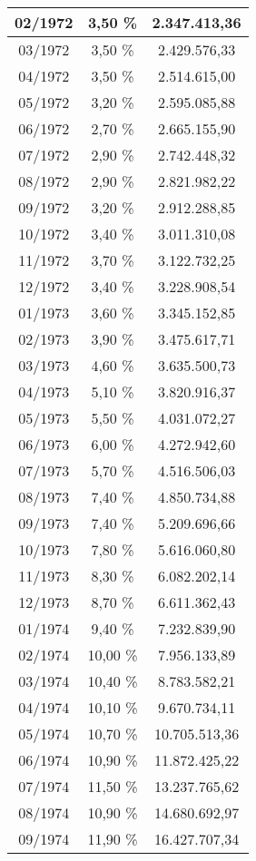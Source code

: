 \begin{center}
\begin{longtable}{|c|c|c|}
02/1972 & 3,50 \% & 2.347.413,36 \\ \hline
03/1972 & 3,50 \% & 2.429.576,33 \\ \hline
04/1972 & 3,50 \% & 2.514.615,00 \\ \hline
05/1972 & 3,20 \% & 2.595.085,88 \\ \hline
06/1972 & 2,70 \% & 2.665.155,90 \\ \hline
07/1972 & 2,90 \% & 2.742.448,32 \\ \hline
08/1972 & 2,90 \% & 2.821.982,22 \\ \hline
09/1972 & 3,20 \% & 2.912.288,85 \\ \hline
10/1972 & 3,40 \% & 3.011.310,08 \\ \hline
11/1972 & 3,70 \% & 3.122.732,25 \\ \hline
12/1972 & 3,40 \% & 3.228.908,54 \\ \hline
01/1973 & 3,60 \% & 3.345.152,85 \\ \hline
02/1973 & 3,90 \% & 3.475.617,71 \\ \hline
03/1973 & 4,60 \% & 3.635.500,73 \\ \hline
04/1973 & 5,10 \% & 3.820.916,37 \\ \hline
05/1973 & 5,50 \% & 4.031.072,27 \\ \hline
06/1973 & 6,00 \% & 4.272.942,60 \\ \hline
07/1973 & 5,70 \% & 4.516.506,03 \\ \hline
08/1973 & 7,40 \% & 4.850.734,88 \\ \hline
09/1973 & 7,40 \% & 5.209.696,66 \\ \hline
10/1973 & 7,80 \% & 5.616.060,80 \\ \hline
11/1973 & 8,30 \% & 6.082.202,14 \\ \hline
12/1973 & 8,70 \% & 6.611.362,43 \\ \hline
01/1974 & 9,40 \% & 7.232.839,90 \\ \hline
02/1974 & 10,00 \% & 7.956.133,89 \\ \hline
03/1974 & 10,40 \% & 8.783.582,21 \\ \hline
04/1974 & 10,10 \% & 9.670.734,11 \\ \hline
05/1974 & 10,70 \% & 10.705.513,36 \\ \hline
06/1974 & 10,90 \% & 11.872.425,22 \\ \hline
07/1974 & 11,50 \% & 13.237.765,62 \\ \hline
08/1974 & 10,90 \% & 14.680.692,97 \\ \hline
09/1974 & 11,90 \% & 16.427.707,34 \\ \hline

\end{longtable}
\end{center}
